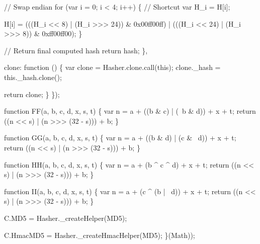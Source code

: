 \begin{DoxyCodeInclude}
            \textcolor{comment}{// Swap endian}
            \textcolor{keywordflow}{for} (var i = 0; i < 4; i++) \{
                \textcolor{comment}{// Shortcut}
                var H\_i = H[i];

                H[i] = (((H\_i << 8)  | (H\_i >>> 24)) & 0x00ff00ff) |
                       (((H\_i << 24) | (H\_i >>> 8))  & 0xff00ff00);
            \}

            \textcolor{comment}{// Return final computed hash}
            \textcolor{keywordflow}{return} hash;
        \},

        clone: \textcolor{keyword}{function} () \{
            var clone = Hasher.clone.call(\textcolor{keyword}{this});
            clone.\_hash = this.\_hash.clone();

            \textcolor{keywordflow}{return} clone;
        \}
    \});

    \textcolor{keyword}{function} FF(a, b, c, d, x, s, t) \{
        var n = a + ((b & c) | (~b & d)) + x + t;
        \textcolor{keywordflow}{return} ((n << s) | (n >>> (32 - s))) + b;
    \}

    \textcolor{keyword}{function} GG(a, b, c, d, x, s, t) \{
        var n = a + ((b & d) | (c & ~d)) + x + t;
        \textcolor{keywordflow}{return} ((n << s) | (n >>> (32 - s))) + b;
    \}

    \textcolor{keyword}{function} HH(a, b, c, d, x, s, t) \{
        var n = a + (b ^ c ^ d) + x + t;
        \textcolor{keywordflow}{return} ((n << s) | (n >>> (32 - s))) + b;
    \}

    \textcolor{keyword}{function} II(a, b, c, d, x, s, t) \{
        var n = a + (c ^ (b | ~d)) + x + t;
        \textcolor{keywordflow}{return} ((n << s) | (n >>> (32 - s))) + b;
    \}

    C.MD5 = Hasher.\_createHelper(MD5);

    C.HmacMD5 = Hasher.\_createHmacHelper(MD5);
\}(Math));
\end{DoxyCodeInclude}
 